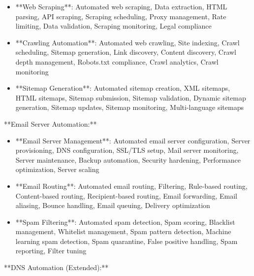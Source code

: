 \documentclass[11pt,a4paper]{article}
\begin{document}
\begin{itemize}
\item **Web Scraping**: Automated web scraping, Data extraction, HTML parsing, API scraping, Scraping scheduling, Proxy management, Rate limiting, Data validation, Scraping monitoring, Legal compliance
\end{itemize}

\begin{itemize}
\item **Crawling Automation**: Automated web crawling, Site indexing, Crawl scheduling, Sitemap generation, Link discovery, Content discovery, Crawl depth management, Robots.txt compliance, Crawl analytics, Crawl monitoring
\end{itemize}

\begin{itemize}
\item **Sitemap Generation**: Automated sitemap creation, XML sitemaps, HTML sitemaps, Sitemap submission, Sitemap validation, Dynamic sitemap generation, Sitemap updates, Sitemap monitoring, Multi-language sitemaps
\end{itemize}

**Email Server Automation:**

\begin{itemize}
\item **Email Server Management**: Automated email server configuration, Server provisioning, DNS configuration, SSL/TLS setup, Mail server monitoring, Server maintenance, Backup automation, Security hardening, Performance optimization, Server scaling
\end{itemize}

\begin{itemize}
\item **Email Routing**: Automated email routing, Filtering, Rule-based routing, Content-based routing, Recipient-based routing, Email forwarding, Email aliasing, Bounce handling, Email queuing, Delivery optimization
\end{itemize}

\begin{itemize}
\item **Spam Filtering**: Automated spam detection, Spam scoring, Blacklist management, Whitelist management, Spam pattern detection, Machine learning spam detection, Spam quarantine, False positive handling, Spam reporting, Filter tuning
\end{itemize}

**DNS Automation (Extended):**
\end{document}
